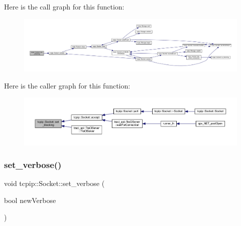 Here is the call graph for this function\+:
\nopagebreak
\begin{figure}[H]
\begin{center}
\leavevmode
\includegraphics[width=350pt]{classtcpip_1_1_socket_ac382abc174bd18e4a61354cd857470c8_cgraph}
\end{center}
\end{figure}
Here is the caller graph for this function\+:
\nopagebreak
\begin{figure}[H]
\begin{center}
\leavevmode
\includegraphics[width=350pt]{classtcpip_1_1_socket_ac382abc174bd18e4a61354cd857470c8_icgraph}
\end{center}
\end{figure}
\mbox{\label{classtcpip_1_1_socket_a695b2054effe2dfc2eddb12b7032b723}} 
\subsubsection{\texorpdfstring{set\+\_\+verbose()}{set\_verbose()}}
{\footnotesize\ttfamily void tcpip\+::\+Socket\+::set\+\_\+verbose (\begin{DoxyParamCaption}\item[{bool}]{new\+Verbose }\end{DoxyParamCaption})\hspace{0.3cm}{\ttfamily [inline]}}

\mbox{\label{classtcpip_1_1_socket_a5633dda8e133b4eba9028b4e460b5587}} 
